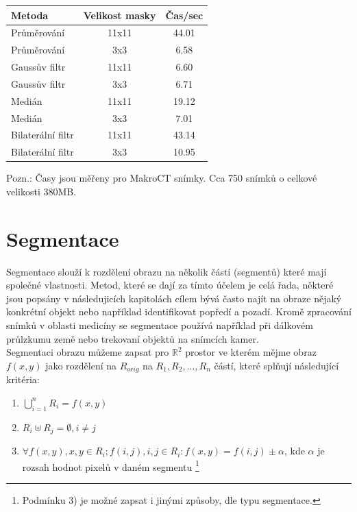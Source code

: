 \documentclass{thesis}%
\begin{document}
\begin{center}
\begin{tabular}{l|c|c}
 
\bfseries \bfseries Metoda & \bfseries Velikost masky & \bfseries Čas/sec\\
\hline \hline
Průměrování &11x11             & 44.01\\
Průměrování &3x3                 & 6.58\\
Gaussův filtr &11x11              & 6.60\\
Gaussův filtr &3x3                  & 6.71\\
Medián &11x11                       &19.12\\
Medián &3x3                           &7.01\\
Bilaterální filtr &11x11            &43.14\\
Bilaterální filtr &3x3                &10.95\\
\end{tabular}
\end{center}
Pozn.: Časy jsou měřeny pro MakroCT snímky. Cca 750 snímků o celkové velikosti 380MB.
\newpage
\section{Segmentace}
Segmentace slouží k rozdělení obrazu na několik částí (segmentů) které mají společné vlastnosti. Metod, které se dají za tímto účelem je celá řada, některé jsou popsány v následujicích kapitolách cílem bývá často najít na obraze nějaký konkrétní objekt nebo například identifikovat popředí a pozadí. Kromě zpracování snímků v oblasti medicíny se segmentace používá například při dálkovém průlzkumu země nebo trekovaní objektů na snímcích kamer.\\
Segmentaci obrazu můžeme zapsat pro $\mathbb{R}^2$ prostor ve kterém mějme obraz $f(x,y)$  jako rozdělení na $R_{orig}$ na $R_{1},R_{2},...,R_{n}$ částí, které splňují následující kritéria:

\begin{enumerate}
	\item $\bigcup_{i=1}^n R_{i} = f(x,y)$
	\item $R_i \uplus R_j = \emptyset, i \neq j$
	\item $\forall f(x,y), x,y \in R_{i}; f(i,j), i,j \in R_{i}: f(x,y) =  f(i,j)\pm \alpha$, kde $\alpha$ je rozsah hodnot pixelů v daném segmentu \footnote[12]{Podmínku 3) je možné zapsat i jinými způsoby, dle typu segmentace.}
\end{enumerate}
\end{document}

